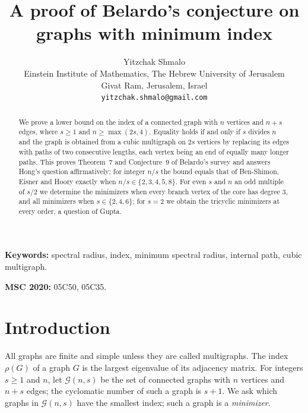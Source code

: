 \documentclass[11pt]{article}
\title{A proof of Belardo's conjecture on graphs with minimum index}
\author{Yitzchak Shmalo\\
Einstein Institute of Mathematics, The Hebrew University of Jerusalem\\
Givat Ram, Jerusalem, Israel\\
\texttt{yitzchak.shmalo@gmail.com}}
\date{}
\theoremstyle{definition}
\theoremstyle{remark}
\newcommand{\G}{\mathcal{G}}
\begin{document}
\maketitle

\begin{abstract}
We prove a lower bound on the index of a connected graph with $n$ vertices and $n+s$ edges, where $s\ge1$ and
$n\ge\max(2s,4)$. Equality holds if and only if $s$ divides $n$ and the graph is obtained from a cubic multigraph on
$2s$ vertices by replacing its edges with paths of two consecutive lengths, each vertex being an end of equally many
longer paths. This proves Theorem~7 and Conjecture~9 of Belardo's survey and answers Hong's question affirmatively;
for integer $n/s$ the bound equals that of Ben-Shimon, Eisner and Hoory exactly when $n/s\in\{2,3,4,5,8\}$. For even
$s$ and $n$ an odd multiple of $s/2$ we determine the minimizers when every branch vertex of the core has degree $3$,
and all minimizers when $s\in\{2,4,6\}$; for $s=2$ we obtain the tricyclic minimizers at every order, a question of Gupta.
\end{abstract}

\noindent\textbf{Keywords:} spectral radius, index, minimum spectral radius, internal path, cubic multigraph.

\noindent\textbf{MSC 2020:} 05C50, 05C35.

\section{Introduction}\label{sec:intro}

All graphs are finite and simple unless they are called multigraphs. The index $\rho(G)$ of a graph $G$ is the largest
eigenvalue of its adjacency matrix. For integers $s\ge1$ and $n$, let $\G(n,s)$ be the set of connected graphs with $n$
vertices and $n+s$ edges; the cyclomatic number of such a graph is $s+1$. We ask which graphs in $\G(n,s)$ have the
smallest index; such a graph is a \emph{minimizer}.
\end{document}
